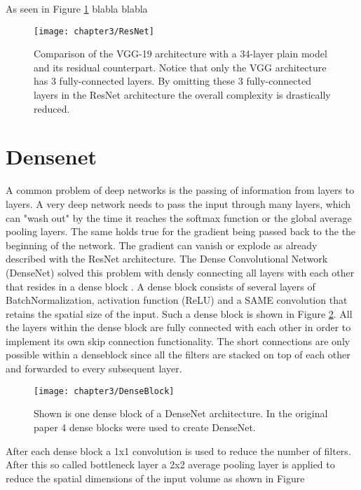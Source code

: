 As seen in Figure \ref{fig:ResNet} blabla blabla

\begin{figure}[H]
  \centering
  \caption{Comparison of the VGG-19 architecture with a 34-layer plain model and its residual counterpart. Notice that only the VGG architecture has 3 fully-connected layers. By omitting these 3 fully-connected layers in the ResNet architecture the overall complexity is drastically reduced. \cite{he2016deep}}
  \texttt{[image: chapter3/ResNet]}
  \label{fig:ResNet}
\end{figure}

\section{Densenet}

A common problem of deep networks is the passing of information from layers to layers. A very deep network needs to pass the input through many layers, which can "wash out" by the time it reaches the softmax function or the global average pooling layers. The same holds true for the gradient being passed back to the the beginning of the network. The gradient can vanish or explode as already described with the ResNet architecture. The Dense Convolutional Network (DenseNet) solved this problem with densly connecting all layers with each other that resides in a dense block \cite{huang2017densely}. A dense block
consists of several layers of BatchNormalization, activation function (ReLU) and a SAME convolution that retains the spatial size of the input. Such a dense block is shown in Figure \ref{fig:DenseBlock}. All the layers within the dense block are fully connected with each other in order to implement its own skip connection functionality. The short connections are only possible within a denseblock since all the filters are stacked on top of each other and forwarded to every subsequent layer.

\begin{figure}[H]
  \centering
  \caption{Shown is one dense block of a DenseNet architecture. In the original paper 4 dense blocks were used to create DenseNet. \cite{huang2017densely}}
  \texttt{[image: chapter3/DenseBlock]}
  \label{fig:DenseBlock}
\end{figure}

After each dense block a 1x1 convolution is used to reduce the number of filters. After this so called bottleneck layer a 2x2 average pooling layer is applied to reduce the spatial dimensions of the input volume as shown in Figure

